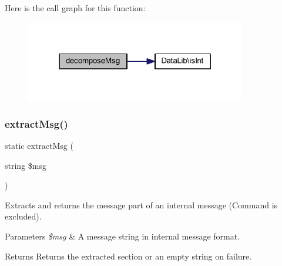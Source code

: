 Here is the call graph for this function\+:
\nopagebreak
\begin{figure}[H]
\begin{center}
\leavevmode
\includegraphics[width=273pt]{class_internal_m_s_g_ab515acd10479df5ff64b2584a2f8fa9d_cgraph}
\end{center}
\end{figure}
\mbox{\label{class_internal_m_s_g_a747d0ca9fce2e083cbb6c9701fcaa795}} 
\subsubsection{extract\+Msg()}
{\footnotesize\ttfamily static extract\+Msg (\begin{DoxyParamCaption}\item[{string}]{\$msg }\end{DoxyParamCaption})\hspace{0.3cm}{\ttfamily [static]}}

Extracts and returns the message part of an internal message (Command is excluded). 
\begin{DoxyParams}{Parameters}
{\em \$msg} & A message string in internal message format. \\
\hline
\end{DoxyParams}
\begin{DoxyReturn}{Returns}
Returns the extracted section or an empty string on failure. 
\end{DoxyReturn}

